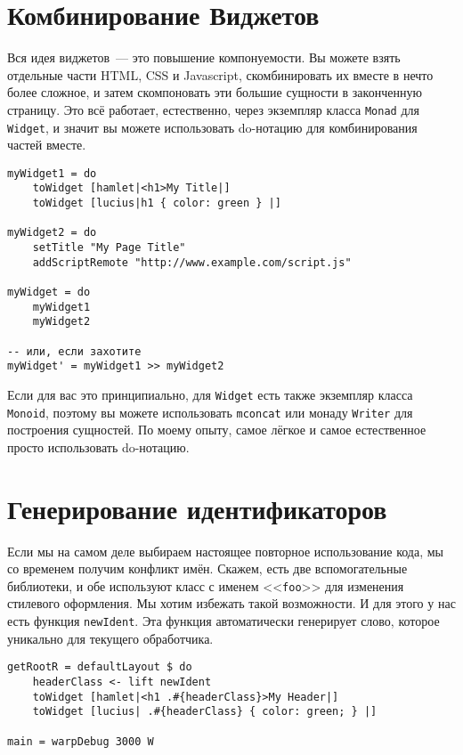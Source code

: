 \section{Комбинирование Виджетов}
Вся идея виджетов~--- это повышение компонуемости. Вы можете взять отдельные части HTML, CSS и Javascript, скомбинировать их вместе в нечто более сложное, и затем скомпоновать эти большие сущности в законченную страницу. Это всё работает, естественно, через экземпляр класса \lstinline'Monad' для \lstinline'Widget', и значит вы можете использовать do-нотацию для комбинирования частей вместе.
\begin{lstlisting}[caption={Комбинирование Виджетов}]
myWidget1 = do
    toWidget [hamlet|<h1>My Title|]
    toWidget [lucius|h1 { color: green } |]

myWidget2 = do
    setTitle "My Page Title"
    addScriptRemote "http://www.example.com/script.js"

myWidget = do
    myWidget1
    myWidget2

-- или, если захотите
myWidget' = myWidget1 >> myWidget2
\end{lstlisting}
\begin{remark}
Если для вас это принципиально, для \lstinline'Widget' есть также экземпляр класса \lstinline'Monoid', поэтому вы можете использовать \lstinline'mconcat' или монаду \lstinline'Writer' для построения сущностей. По моему опыту, самое лёгкое и самое естественное просто использовать do-нотацию.
\end{remark}

\section{Генерирование идентификаторов}
Если мы на самом деле выбираем настоящее повторное использование кода, мы со временем получим конфликт имён. Скажем, есть две вспомогательные библиотеки, и обе используют класс с именем <<\lstinline'foo'>> для изменения стилевого оформления. Мы хотим избежать такой возможности. И для этого у нас есть функция \lstinline'newIdent'. Эта функция автоматически генерирует слово, которое уникально для текущего обработчика.

\begin{lstlisting}[caption={Использование \lstinline'newIdent'}]
getRootR = defaultLayout $ do
    headerClass <- lift newIdent
    toWidget [hamlet|<h1 .#{headerClass}>My Header|]
    toWidget [lucius| .#{headerClass} { color: green; } |]

main = warpDebug 3000 W
\end{lstlisting}

